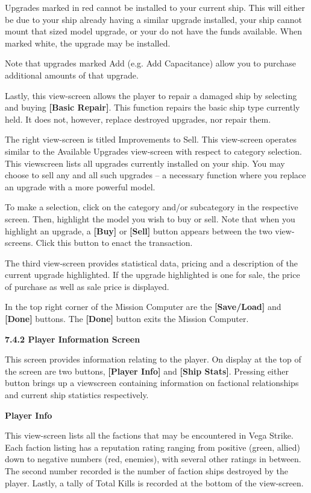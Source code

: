 \documentclass{article}
\begin{document}
Upgrades marked in red cannot be installed to your current ship. This will either be due to your ship already having a similar upgrade installed, your ship cannot mount that sized model upgrade, or your do not have the funds available. When marked white, the upgrade may be installed. 

Note that upgrades marked Add (e.g. Add Capacitance) allow you to purchase additional amounts of that upgrade. 

Lastly, this view-screen allows the player to repair a damaged ship by selecting and buying \textbf{[Basic Repair]}. This function repairs the basic ship type currently held. It does not, however, replace destroyed upgrades, nor repair them. 

The right view-screen is titled Improvements to Sell. This view-screen operates similar to the Available Upgrades view-screen with respect to category selection. This viewscreen lists all upgrades currently installed on your ship. You may choose to sell any and all such upgrades -- a necessary function where you replace an upgrade with a more powerful model. 



To make a selection, click on the category and/or subcategory in the respective screen. Then, highlight the model you wish to buy or sell. Note that when you highlight an upgrade, a \textbf{[Buy] }or \textbf{[Sell] }button appears between the two view-screens. Click this button to enact the transaction. 

The third view-screen provides statistical data, pricing and a description of the current upgrade highlighted. If the upgrade highlighted is one for sale, the price of purchase as well as sale price is displayed. 

In the top right corner of the Mission Computer are the \textbf{[Save/Load] }and \textbf{[Done] }buttons. The \textbf{[Done] }button exits the Mission Computer. 

\textbf{7.4.2 Player Information Screen }

This screen provides information relating to the player. On display at the top of the screen are two buttons, \textbf{[Player Info] }and \textbf{[Ship Stats]}. Pressing either button brings up a viewscreen containing information on factional relationships and current ship statistics respectively. 

\textbf{}

\textbf{Player Info }

This view-screen lists all the factions that may be encountered in Vega Strike. Each faction listing has a reputation rating ranging from positive (green, allied) down to negative numbers (red, enemies), with several other ratings in between. The second number recorded is the number of faction ships destroyed by the player. Lastly, a tally of Total Kills is recorded at the bottom of the view-screen. 
\end{document}
